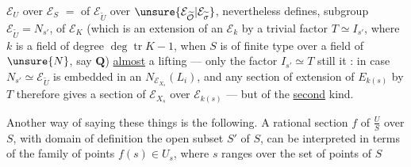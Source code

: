 $\mathcal E_U$ over $\mathcal E_S$  $=$ of $\mathcal E_{\widetilde U}$ over $\unsure{\mathcal E_{\widetilde{\mathcal O}}|\mathcal E_{\widetilde\sigma}}$, nevertheless defines,   subgroup $\mathcal E_{\widetilde U}=N_{s'}$, of $\mathcal E_K$ (which is an extension of an $\mathcal E_k$ by a trivial  factor $T\simeq I_{s'}$, where $k$ is a field of  degree $\deg\operatorname{tr}K-1$, when $S$ is of finite type over a field of $\unsure{N}$, say $\mathbf Q$) \uline{almost} a lifting --- only the factor $I_{s'}\simeq T$ still  it : in  case $N_{s'}\simeq\mathcal E_{\widetilde U}$ is embedded in an $N_{\mathcal E_{X_s}}(L_i)$, and any section of  extension of $E_{k(s)}$ by $T$ therefore gives a section of $\mathcal E_{X_s}$ over $\mathcal E_{k(s)}$ --- but of the \uline{second} kind.

Another way of saying these things is the following. A rational section $f$ of $\frac{U}{S}$ over $S$, with domain of definition the open subset $S'$ of $S$,  can be interpreted in terms of the family of points $f(s)\in U_s$, where $s$ ranges over the set of points of $S$

